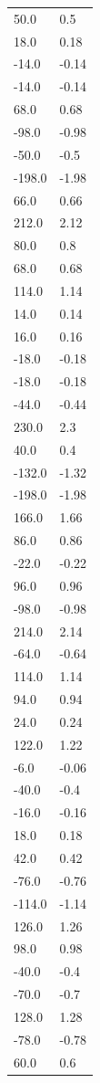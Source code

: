 \begin{longtable}{ll}
50.0 & 0.5 \\
18.0 & 0.18 \\
-14.0 & -0.14 \\
-14.0 & -0.14 \\
68.0 & 0.68 \\
-98.0 & -0.98 \\
-50.0 & -0.5 \\
-198.0 & -1.98 \\
66.0 & 0.66 \\
212.0 & 2.12 \\
80.0 & 0.8 \\
68.0 & 0.68 \\
114.0 & 1.14 \\
14.0 & 0.14 \\
16.0 & 0.16 \\
-18.0 & -0.18 \\
-18.0 & -0.18 \\
-44.0 & -0.44 \\
230.0 & 2.3 \\
40.0 & 0.4 \\
-132.0 & -1.32 \\
-198.0 & -1.98 \\
166.0 & 1.66 \\
86.0 & 0.86 \\
-22.0 & -0.22 \\
96.0 & 0.96 \\
-98.0 & -0.98 \\
214.0 & 2.14 \\
-64.0 & -0.64 \\
114.0 & 1.14 \\
94.0 & 0.94 \\
24.0 & 0.24 \\
122.0 & 1.22 \\
-6.0 & -0.06 \\
-40.0 & -0.4 \\
-16.0 & -0.16 \\
18.0 & 0.18 \\
42.0 & 0.42 \\
-76.0 & -0.76 \\
-114.0 & -1.14 \\
126.0 & 1.26 \\
98.0 & 0.98 \\
-40.0 & -0.4 \\
-70.0 & -0.7 \\
128.0 & 1.28 \\
-78.0 & -0.78 \\
60.0 & 0.6 \\

\end{longtable}
